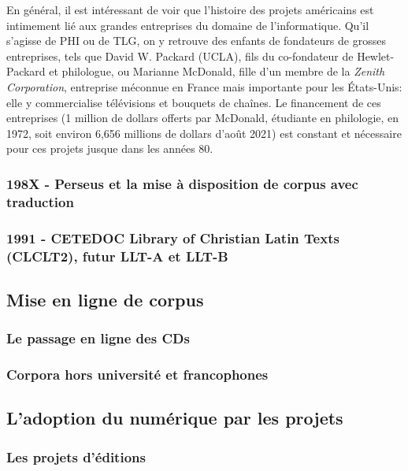 En général, il est intéressant de voir que l'histoire des projets américains est intimement lié aux grandes entreprises du domaine de l'informatique. Qu'il s'agisse de PHI ou de TLG, on y retrouve des enfants de fondateurs de grosses entreprises, tels que David W. Packard (UCLA), fils du co-fondateur de Hewlet-Packard et philologue, ou Marianne McDonald, fille d'un membre de la \textit{Zenith Corporation}, entreprise méconnue en France mais importante pour les États-Unis: elle y commercialise télévisions et bouquets de chaînes. Le financement de ces entreprises (1 million de dollars offerts par McDonald, étudiante en philologie, en 1972, soit environ 6,656 millions de dollars d'août 2021) est constant et nécessaire pour ces projets jusque dans les années 80.

\subsubsection{198X - Perseus et la mise à disposition de corpus avec traduction}
\subsubsection{1991 - CETEDOC Library of Christian Latin Texts (CLCLT2), futur LLT-A et LLT-B}

\subsection{Mise en ligne de corpus}
\subsubsection{Le passage en ligne des CDs}


\subsubsection{Corpora hors université et francophones}


\subsection{L’adoption du numérique par les projets}

\subsubsection{Les projets d’éditions}


